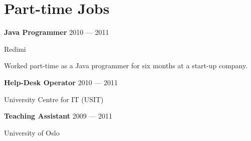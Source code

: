 \section{Part-time Jobs}

\parbox[t][][t]{\linewidth}{
	\parbox{\linewidth}{\textbf{Java Programmer} \hfill {{2010 --- 2011}}}
	\parbox{\linewidth}{Redimi}
	\smallbreak
	\smallskip
	Worked part-time as a Java programmer for six months at a start-up company.
	\bigbreak
	\smallskip
}

\parbox[t][][t]{\linewidth}{
	\parbox{\linewidth}{\textbf{Help-Desk Operator} \hfill {{2010 --- 2011}}}
	\parbox{\linewidth}{University Centre for IT (USIT)}
	\bigbreak
	\smallskip
}

\parbox[t][][t]{\linewidth}{
	\parbox{\linewidth}{\textbf{Teaching Assistant} \hfill {{2009 --- 2011}}}
	\parbox{\linewidth}{University of Oslo}
	\bigbreak
	\smallskip
}


